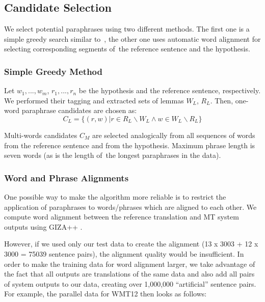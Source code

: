 \documentclass[11pt]{article}
\def\equo#1{``#1''}
\begin{document}
\subsection{Candidate Selection}
We select potential paraphrases using two different methods. The first one is a 
simple greedy search similar to~, the other one uses automatic 
word alignment for selecting corresponding segments of~the reference sentence 
and the hypothesis.

\subsubsection*{Simple Greedy Method}
Let $ w_1,...,w_m $, $ r_1,..., r_n $ be the hypothesis and the reference 
sentence, respectively. We performed their tagging and extracted sets of lemmas 
 $ W_{L} $, $ R_{L} $. Then, one-word paraphrase candidates are chosen as:
$$ C_{L} = \lbrace (r,w) | r \in R_{L} \smallsetminus W_{L} \wedge w \in W_{L}
\smallsetminus R_{L}  \rbrace $$

Multi-words candidates $ C_M $ are selected analogically from all sequences 
of words from the reference sentence and from the hypothesis. Maximum phrase 
length is seven words (as is the length of~the longest paraphrases in 
the data). %
%

\subsubsection*{Word and Phrase Alignments}
One possible way to make the algorithm more reliable is to restrict the 
application of paraphrases to words/phrases which are aligned to each other. We 
compute word alignment between the reference translation and MT system outputs 
using GIZA++ \cite{gizapp}.

However, if we used only our test data to create the alignment (13 x 3003 + 12 
x 3000 = 75039 sentence pairs), the alignment quality would be insufficient. In 
order to make the training data for word alignment larger, we take advantage of 
the fact that all outputs are translations of the same data and also add all 
pairs of system outputs to our data, creating over 1,000,000 \equo{artificial} 
sentence pairs. For example, the parallel data for WMT12 then looks as follows:
\end{document}
